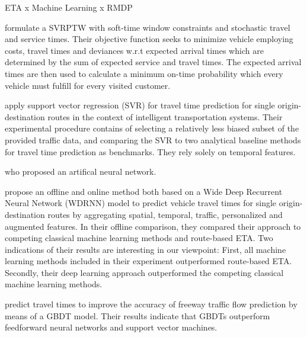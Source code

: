 \cite{Liu2018_LM_PLM} ETA x Machine Learning x RMDP
 
   


\cite{Zhang2013} formulate a SVRPTW with soft-time window constraints and stochastic travel and service times. Their objective function seeks to minimize vehicle employing costs, travel times and deviances w.r.t expected arrival times which are determined by the sum of expected service and travel times. The expected arrival times are then used to calculate a minimum on-time probability which every vehicle must fulfill for every visited customer.  

\cite{Wu2004_SVR} apply support vector regression (SVR) for travel time prediction for single origin-destination routes in the context of intelligent transportation systems. Their experimental procedure contains of selecting a relatively less biased subset of the provided traffic data, and comparing the SVR to two analytical baseline methods for travel time prediction as benchmarks. They rely solely on temporal features.

\cite{Vanajakshi2007_SVR}
\cite{Masiero2011_SVR}

\cite{Chen2004_ANNKalman} who proposed an artifical neural network.

\cite{Siripanpornchana2016_AnnWithDbnFS}

\cite{Goudarzi2018Comparison}

\cite{Wang2018_WDR_DL} propose an offline and online method both based on a Wide Deep Recurrent Neural Network (WDRNN) model to predict vehicle travel times for single origin-destination routes by aggregating spatial, temporal, traffic, personalized and augmented features. In their offline comparison, they compared their approach to competing classical machine learning methods and route-based ETA. Two indications of their results are interesting in our viewpoint: First, all machine learning methods included in their experiment outperformed route-based ETA. Secondly, their deep learning approach outperformed the competing classical machine learning methods.  

\cite{Cheng2019_GBDT} predict travel times to improve the accuracy of freeway traffic flow prediction by means of a GBDT model. Their results indicate that GBDTs outperform feedforward neural networks and support vector machines. 
 

